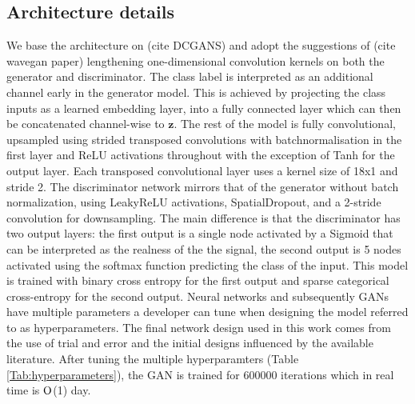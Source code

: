\documentclass[12pt]{iopart}
\begin{document}
\subsection{Architecture details}
We base the architecture on (cite DCGANS) and adopt the suggestions of (cite wavegan paper) lengthening one-dimensional convolution kernels on both the generator and discriminator. The class label is interpreted as an additional channel early in the generator model. This is achieved by projecting the class inputs as a learned embedding layer, into a fully connected layer which can then be concatenated channel-wise to $\textbf{z}$. The rest of the model is fully convolutional, upsampled using strided transposed convolutions with batchnormalisation in the first layer and ReLU activations throughout with the exception of Tanh for the output layer. Each transposed convolutional layer uses a kernel size of 18x1 and stride 2.
The discriminator network mirrors that of the generator without batch normalization, using LeakyReLU activations, SpatialDropout, and a 2-stride convolution for downsampling. The main difference is that the discriminator has two output layers: the first output is a single node activated by a Sigmoid that can be interpreted as the realness of the the signal, the second output is 5 nodes activated using the softmax function predicting the class of the input. This model is trained with binary cross entropy for the first output and sparse categorical cross-entropy for the second output.
Neural networks and subsequently GANs have multiple parameters a developer can tune when designing the model referred to as hyperparameters. The final network design used in this work comes from the use of trial and error and the initial designs influenced by the available literature. After tuning the multiple hyperparamters (Table \ref{Tab:hyperparameters}), the GAN is trained for 600000 iterations which in real time is $\mathord{\mathrm{O}}$(1) day.

\end{document}
